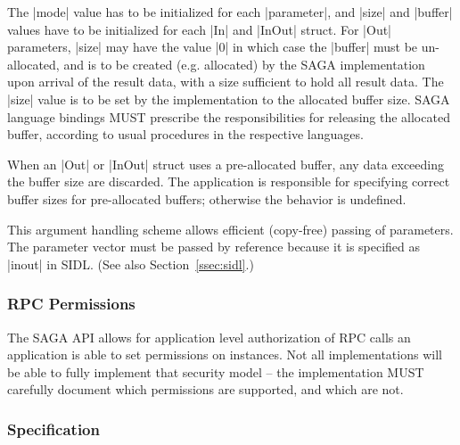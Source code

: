   The |mode| value has to be initialized for each |parameter|,
  and |size| and |buffer| values have to be initialized for each
  |In| and |InOut| struct. For |Out| parameters, |size| may have
  the value |0| in which case the |buffer| must be un-allocated,
  and is to be created (e.g. allocated) by the SAGA
  implementation upon arrival of the result data, with a size
  sufficient to hold all result data.  The |size| value is to be
  set by the implementation to the allocated buffer size.  SAGA
  language bindings MUST prescribe the responsibilities for
  releasing the allocated buffer, according to usual procedures
  in the respective languages.
  
  When an |Out| or |InOut| struct uses a pre-allocated buffer,
  any data exceeding the buffer size are discarded.  The
  application is responsible for specifying correct buffer sizes
  for pre-allocated buffers; otherwise the behavior is
  undefined.
 
  This argument handling scheme allows efficient (copy-free)
  passing of parameters. The parameter vector must be passed by
  reference because it is specified as |inout| in SIDL. (See
  also Section~\ref{ssec:sidl}.) 
  
   \subsubsection{RPC Permissions}
 
    The SAGA API allows for application level
    authorization of RPC calls an application is able to set
    permissions on  instances.  Not all
    implementations will be able to fully implement that
    security model -- the implementation MUST carefully document
    which permissions are supported, and which are not.
 
 \subsubsection{Specification}
 
